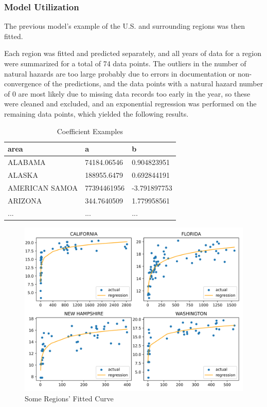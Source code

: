 \documentclass[12pt]{article}  %
\begin{document}
\subsubsection{Model Utilization}
The previous model's example of the U.S. and surrounding regions was then fitted.

Each region was fitted and predicted separately, and all years of data for a region were summarized for a total of 74 data points. The outliers in the number of natural hazards are too large probably due to errors in documentation or non-convergence of the predictions, and the data points with a natural hazard number of 0 are most likely due to missing data records too early in the year, so these were cleaned and excluded, and an exponential regression was performed on the remaining data points, which yielded the following results.


\begin{table}[!ht]
    \centering
    \begin{tabular}{|l|l|l|}
    \hline
        area & a & b \\ \hline
        ALABAMA & 74184.06546 & 0.904823951 \\ \hline
        ALASKA & 188955.6479 & 0.692844191 \\ \hline
        AMERICAN SAMOA & 77394461956 & -3.791897753 \\ \hline
        ARIZONA & 344.7640509 & 1.779958561 \\ \hline
        ... & ... & ... \\ \hline
    \end{tabular}
    \caption{\label{demo-table}Coefficient Examples}
\end{table}

\clearpage

\begin{figure}[htbp]
\centering
\includegraphics[width=.6\textwidth]{img/img03.png}
\caption{Some Regions' Fitted Curve}
\end{figure}
\end{document}
